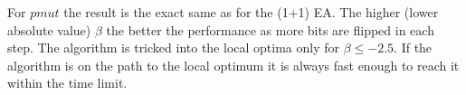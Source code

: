 For $pmut$ the result is the exact same as for the (1+1) EA.
The higher (lower absolute value) $\beta$ the better the performance as more bits are flipped in each step.
The algorithm is tricked into the local optima only for $\beta\le-2.5$.
If the algorithm is on the path to the local optimum it is always fast enough to reach it within the time limit.